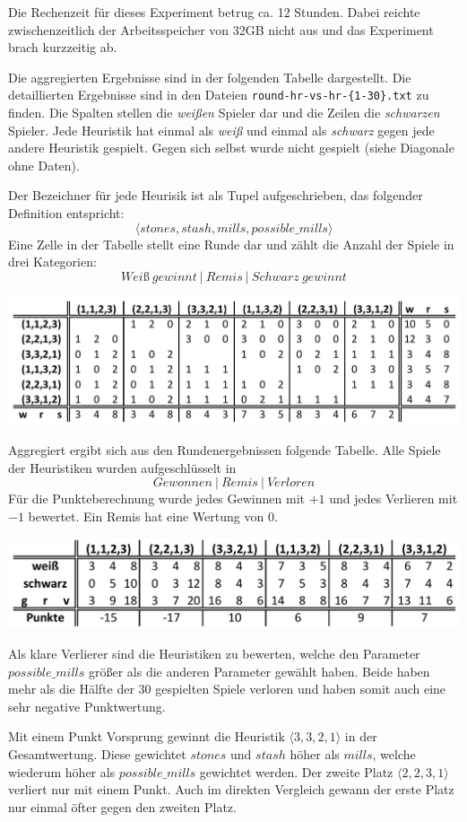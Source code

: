 \documentclass[11pt]{article}
\begin{document}
    Die Rechenzeit für dieses Experiment betrug ca. 12 Stunden. Dabei
reichte zwischenzeitlich der Arbeitsspeicher von 32GB nicht aus und das
Experiment brach kurzzeitig ab.

Die aggregierten Ergebnisse sind in der folgenden Tabelle dargestellt.
Die detaillierten Ergebnisse sind in den Dateien
\texttt{round-hr-vs-hr-\{1-30\}.txt} zu finden. Die Spalten stellen die
\emph{weißen} Spieler dar und die Zeilen die \emph{schwarzen} Spieler.
Jede Heuristik hat einmal als \emph{weiß} und einmal als \emph{schwarz}
gegen jede andere Heuristik gespielt. Gegen sich selbst wurde nicht
gespielt (siehe Diagonale ohne Daten).

Der Bezeichner für jede Heurisik ist als Tupel aufgeschrieben, das
folgender Definition entspricht:
\[\langle stones, stash, mills, possible\_mills \rangle\] Eine Zelle in
der Tabelle stellt eine Runde dar und zählt die Anzahl der Spiele in
drei Kategorien: \[Weiß\ gewinnt\ |\ Remis\ |\ Schwarz\ gewinnt\]

\includegraphics{../images/nmm-hr-vs-hr-rounds.png}

Aggregiert ergibt sich aus den Rundenergebnissen folgende Tabelle. Alle
Spiele der Heuristiken wurden aufgeschlüsselt in
\[Gewonnen\ |\ Remis\ |\ Verloren \] Für die Punkteberechnung wurde
jedes Gewinnen mit \(+1\) und jedes Verlieren mit \(-1\) bewertet. Ein
Remis hat eine Wertung von \(0\).

\includegraphics{../images/nmm-hr-vs-hr-total.png}

Als klare Verlierer sind die Heuristiken zu bewerten, welche den
Parameter \(possible\_mills\) größer als die anderen Parameter gewählt
haben. Beide haben mehr als die Hälfte der 30 gespielten Spiele verloren
und haben somit auch eine sehr negative Punktwertung.

Mit einem Punkt Vorsprung gewinnt die Heuristik
\(\langle 3,3,2,1 \rangle\) in der Gesamtwertung. Diese gewichtet
\(stones\) und \(stash\) höher als \(mills\), welche wiederum höher als
\(possible\_mills\) gewichtet werden. Der zweite Platz
\(\langle 2,2,3,1 \rangle\) verliert nur mit einem Punkt. Auch im
direkten Vergleich gewann der erste Platz nur einmal öfter gegen den
zweiten Platz.
\end{document}
